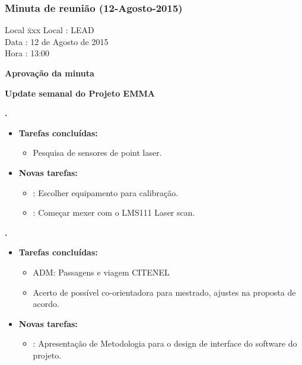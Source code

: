 \subsubsection{Minuta de reunião (12-Agosto-2015)}

\begin{tabbing}
  Local \= xxx \kill
  Local \> : LEAD \\
  Data  \> : 12 de Agosto de 2015 \\
  Hora  \> : 13:00
\end{tabbing}


\textbf{Aprovação da minuta}

\textbf{Update semanal do Projeto EMMA}
   							
\textbf{\elael.} 
	\begin{itemize}
		\item \textbf{Tarefas concluídas:}
			\begin{itemize}    
				\item Pesquisa de sensores de point laser. 
			\end{itemize}
		
		\item \textbf{Novas tarefas:}
			\begin{itemize} 
				\item: Escolher equipamento para calibração.
				\item: Começar mexer com o LMS111 Laser scan. 
			\end{itemize}
	\end{itemize}
	
	\textbf{\Julia.} 
	\begin{itemize}
		\item \textbf{Tarefas concluídas:}
			\begin{itemize}    
				\item ADM: Passagens e viagem CITENEL
				\item Acerto de possível co-orientadora para mestrado, ajustes na proposta
				de acordo.
			\end{itemize}
		
		\item \textbf{Novas tarefas:}
			\begin{itemize} 
				\item: Apresentação de Metodologia para o design de interface do software do
				projeto.
			\end{itemize}
	\end{itemize}
					
